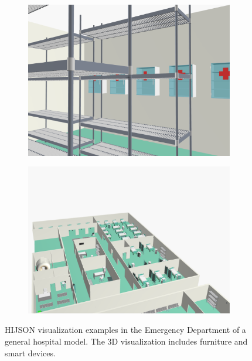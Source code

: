 \documentclass[]{egpubl}
\begin{document}
\begin{figure}[htbp]
\begin{subfigure}[b]{0.165\textwidth}
   \includegraphics[width=\textwidth]{images/emergency/12}
   \end{subfigure}
 \hspace{-1.5mm}   
   \begin{subfigure}[b]{0.165\textwidth}
   \includegraphics[width=\textwidth]{images/emergency/14}
   \end{subfigure}
   
   \caption{HIJSON visualization examples in the Emergency Department of a general hospital model. The 3D visualization includes furniture and smart devices.}
   \label{fig:er}
\end{figure}

\end{document}
